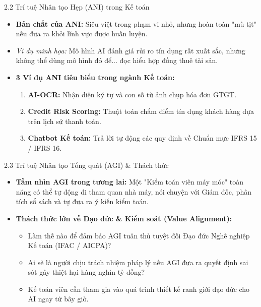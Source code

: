\documentclass[aspectratio=169]{beamer}
\begin{document}
\begin{frame}{2.2 Trí tuệ Nhân tạo Hẹp (ANI) trong Kế toán}
    \begin{itemize}
        \item \textbf{Bản chất của ANI:} Siêu việt trong phạm vi nhỏ, nhưng hoàn toàn "mù tịt" nếu đưa ra khỏi lĩnh vực được huấn luyện.
        \item \emph{Ví dụ minh họa:} Mô hình AI đánh giá rủi ro tín dụng rất xuất sắc, nhưng không thể dùng mô hình đó để... đọc hiểu hợp đồng thuê tài sản.
        \item \textbf{3 Ví dụ ANI tiêu biểu trong ngành Kế toán:}
        \begin{enumerate}
            \item \textbf{AI-OCR:} Nhận diện ký tự và con số từ ảnh chụp hóa đơn GTGT.
            \item \textbf{Credit Risk Scoring:} Thuật toán chấm điểm tín dụng khách hàng dựa trên lịch sử thanh toán.
            \item \textbf{Chatbot Kế toán:} Trả lời tự động các quy định về Chuẩn mực IFRS 15 / IFRS 16.
        \end{enumerate}
    \end{itemize}
\end{frame}

\begin{frame}{2.3 Trí tuệ Nhân tạo Tổng quát (AGI) \& Thách thức}
    \begin{itemize}
        \item \textbf{Tầm nhìn AGI trong tương lai:} Một "Kiểm toán viên máy móc" toàn năng có thể tự động đi tham quan nhà máy, nói chuyện với Giám đốc, phân tích sổ sách và tự đưa ra ý kiến kiểm toán.
        \item \textbf{Thách thức lớn về Đạo đức \& Kiểm soát (Value Alignment):}
        \begin{itemize}
            \item Làm thế nào để đảm bảo AGI tuân thủ tuyệt đối Đạo đức Nghề nghiệp Kế toán (IFAC / AICPA)?
            \item Ai sẽ là người chịu trách nhiệm pháp lý nếu AGI đưa ra quyết định sai sót gây thiệt hại hàng nghìn tỷ đồng?
            \item Kế toán viên cần tham gia vào quá trình thiết kế ranh giới đạo đức cho AI ngay từ bây giờ.
        \end{itemize}
    \end{itemize}
\end{frame}
\end{document}
